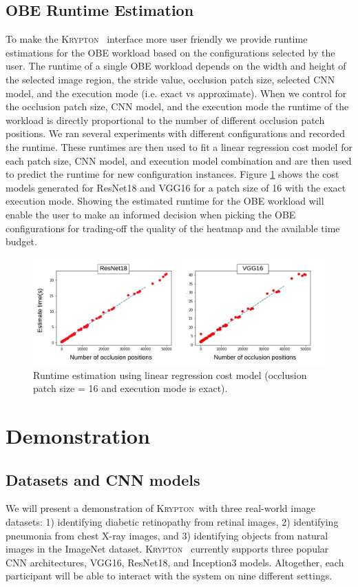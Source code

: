 \documentclass{vldb}
\newcommand{\system}{\textsc{Krypton}}
\begin{document}
\subsection{OBE Runtime Estimation}
To make the \system~ interface more user friendly we provide runtime estimations for the OBE workload based on the configurations selected by the user.
The runtime of a single OBE workload depends on the width and height of the selected image region, the stride value, occlusion patch size, selected CNN model, and the execution mode (i.e. exact vs approximate).
When we control for the occlusion patch size, CNN model, and the execution mode the runtime of the workload is directly proportional to the number of different occlusion patch positions.
We ran several experiments with different configurations and recorded the runtime.
These runtimes are then used to fit a linear regression cost model for each patch size, CNN model, and execution model combination and are then used to predict the runtime for new configuration instances.
Figure \ref{fig:runtime_estimation} shows the cost models generated for ResNet18 and VGG16 for a patch size of 16 with the exact execution mode.
Showing the estimated runtime for the OBE workload will enable the user to make an informed decision when picking the OBE configurations for trading-off the quality of the heatmap and the available time budget.

\begin{figure}
\includegraphics[width=\columnwidth]{images/runtime_estimation.pdf}
\caption{Runtime estimation using linear regression cost model (occlusion patch size = 16 and execution mode is exact).}
\label{fig:runtime_estimation}
\vspace{-2mm}
\end{figure}


\section{Demonstration}\label{demonstration}
\subsection{Datasets and CNN models}
We will present a demonstration of \system ~with three real-world image datasets: 1) identifying diabetic retinopathy from retinal images, 2) identifying pneumonia from chest X-ray images, and 3) identifying objects from natural images in the ImageNet dataset.
\system~ currently supports three popular CNN architectures, VGG16, ResNet18, and Inception3 models. Altogether, each participant will be able to interact with the system on nine different settings.
\end{document}
